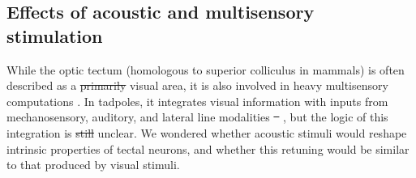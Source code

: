 \documentclass{article}
\providecommand{\DIFaddtex}[1]{{\protect\color{blue}{#1}}} %
\providecommand{\DIFdeltex}[1]{{\protect\color{red}\sout{#1}}}                      %
\providecommand{\DIFaddbegin}{} %
\providecommand{\DIFaddend}{} %
\providecommand{\DIFdelbegin}{} %
\providecommand{\DIFdelend}{} %
\providecommand{\DIFadd}[1]{\texorpdfstring{\DIFaddtex{#1}}{#1}} %
\providecommand{\DIFdel}[1]{\texorpdfstring{\DIFdeltex{#1}}{}} %
\newcommand{\DIFscaledelfig}{0.5}
\newlength{\DIFdelgraphicswidth} %
\newlength{\DIFdelgraphicsheight} %
\newcommand{\DIFaddincludegraphics}[2][]{{\color{blue}\fbox{\DIFOincludegraphics[#1]{#2}}}} %
\newcommand{\DIFdelincludegraphics}[2][]{%
\sbox{\DIFdelgraphicsbox}{\DIFOincludegraphics[#1]{#2}}%
\settoboxwidth{\DIFdelgraphicswidth}{\DIFdelgraphicsbox} %
\settoboxtotalheight{\DIFdelgraphicsheight}{\DIFdelgraphicsbox} %
\scalebox{\DIFscaledelfig}{%
\parbox[b]{\DIFdelgraphicswidth}{\usebox{\DIFdelgraphicsbox}\\[-\baselineskip] \rule{\DIFdelgraphicswidth}{0em}}\llap{\resizebox{\DIFdelgraphicswidth}{\DIFdelgraphicsheight}{%
\setlength{\unitlength}{\DIFdelgraphicswidth}%
\begin{picture}(1,1)%
\thicklines\linethickness{2pt} %
{\color[rgb]{1,0,0}\put(0,0){\framebox(1,1){}}}%
{\color[rgb]{1,0,0}\put(0,0){\line( 1,1){1}}}%
{\color[rgb]{1,0,0}\put(0,1){\line(1,-1){1}}}%
\end{picture}%
}\hspace*{3pt}}} %
} %
\DeclareRobustCommand{\DIFaddbegin}{\DIFOaddbegin \let\includegraphics\DIFaddincludegraphics} %
\DeclareRobustCommand{\DIFaddend}{\DIFOaddend \let\includegraphics\DIFOincludegraphics} %
\DeclareRobustCommand{\DIFdelbegin}{\DIFOdelbegin \let\includegraphics\DIFdelincludegraphics} %
\DeclareRobustCommand{\DIFdelend}{\DIFOaddend \let\includegraphics\DIFOincludegraphics} %
\begin{document}
\subsection*{Effects of acoustic and multisensory stimulation}

While the optic tectum (homologous to superior colliculus in mammals) is often described as a \DIFdelbegin \DIFdel{primarily }\DIFdelend visual area, it is also involved in heavy multisensory computations \citep{stein2014}. In tadpoles, it integrates visual information with inputs from mechanosensory, auditory, and lateral line modalities \DIFdelbegin \DIFdel{\mbox{%
\citep{deeg2009,pratt2009,hiramoto2009,felch2016,truszkowski2017}}\hspace{0pt}%
}\DIFdelend \DIFaddbegin \DIFadd{\mbox{%
\citep{deeg2009,pratt2009trigeminal,hiramoto2009,felch2016,truszkowski2017}}\hspace{0pt}%
}\DIFaddend , but the logic of this integration is \DIFdelbegin \DIFdel{still }\DIFdelend unclear. We wondered whether acoustic stimuli would reshape intrinsic properties of tectal neurons, and whether this retuning would be similar to that produced by visual stimuli. 
\end{document}
